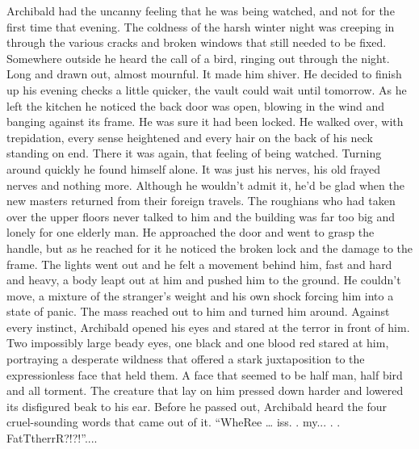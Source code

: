 Archibald had the uncanny feeling that he was being watched, and not for the first time that evening. The coldness of the harsh winter night was creeping in through the various cracks and broken windows that still needed to be fixed. Somewhere outside he heard the call of a bird, ringing out through the night. Long and drawn out, almost mournful. It made him shiver. He decided to finish up his evening checks a little quicker, the vault could wait until tomorrow. As he left the kitchen he noticed the back door was open, blowing in the wind and banging against its frame. He was sure it had been locked. He walked over, with trepidation, every sense heightened and every hair on the back of his neck standing on end. There it was again, that feeling of being watched. Turning around quickly he found himself alone. It was just his nerves, his old frayed nerves and nothing more. Although he wouldn’t admit it, he’d be glad when the new masters returned from their foreign travels. The roughians who had taken over the upper floors never talked to him and the building was far too big and lonely for one elderly man. He approached the door and went to grasp the handle, but as he reached for it he noticed the broken lock and the damage to the frame. The lights went out and he felt a movement behind him, fast and hard and heavy, a body leapt out at him and pushed him to the ground. He couldn’t move, a mixture of the stranger’s weight and his own shock forcing him into a state of panic. The mass reached out to him and turned him around. Against every instinct, Archibald opened his eyes and stared at the terror in front of him. Two impossibly large beady eyes, one black and one blood red stared at him, portraying a desperate wildness that offered a stark juxtaposition to the expressionless face that held them. A face that seemed to be half man, half bird and all torment. The creature that lay on him pressed down harder and lowered its disfigured beak to his ear. Before he passed out, Archibald heard the four cruel-sounding words that came out of it. “WheRee … iss. . my... . . FatTtherrR?!?!”....\medskip
